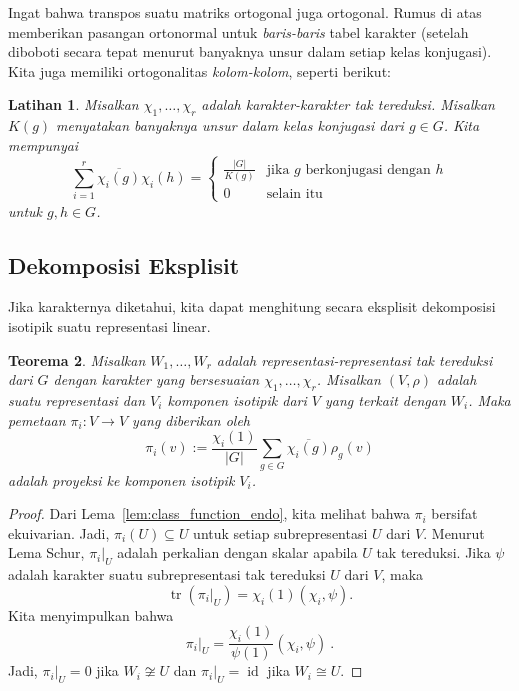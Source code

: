 \documentclass[12pt]{article}
\theoremstyle{plain}
\newtheorem{theorem}{Teorema}[section]
\newtheorem{exercise}[theorem]{Latihan}
\theoremstyle{definition}
\theoremstyle{remark}
\numberwithin{equation}{section}
\begin{document}
Ingat bahwa transpos suatu matriks ortogonal juga ortogonal.
Rumus di atas memberikan pasangan ortonormal untuk
\emph{baris-baris} tabel karakter (setelah diboboti secara tepat menurut banyaknya unsur dalam
setiap kelas konjugasi). Kita juga memiliki ortogonalitas
\emph{kolom-kolom}, seperti berikut:

\begin{exercise}
Misalkan $\chi_1,\ldots,\chi_r$ adalah karakter-karakter tak tereduksi.
Misalkan $K(g)$ menyatakan banyaknya unsur dalam kelas konjugasi dari $g \in
G$.
Kita mempunyai
\[
\sum_{i=1}^r \overline{\chi_i(g)} \chi_i(h) =
\begin{cases}
\frac{|G|}{K(g)} & \textrm{jika $g$ berkonjugasi dengan $h$}\\
0 & \textrm{selain itu}
\end{cases}
\]
untuk $g, h \in G$.
\end{exercise}

\subsection{Dekomposisi Eksplisit}

Jika karakternya diketahui, kita dapat menghitung secara eksplisit dekomposisi
isotipik suatu representasi linear.

\begin{theorem}
Misalkan $W_1,\ldots, W_r$ adalah representasi-representasi tak tereduksi dari $G$ dengan
karakter yang bersesuaian $\chi_1,\ldots, \chi_r$.
Misalkan $(V,\rho)$ adalah suatu representasi dan $V_i$ komponen isotipik
dari $V$ yang terkait dengan $W_i$.
Maka pemetaan $\pi_i : V \to V$ yang diberikan oleh
\[
\pi_i(v) := \frac{\chi_i(1)}{|G|} \sum_{g \in G} \overline{\chi_i(g)} \rho_g(v)
\]
adalah proyeksi ke komponen isotipik $V_i$.
\end{theorem}

\begin{proof}
Dari Lema~\ref{lem:class_function_endo}, kita melihat bahwa
$\pi_i$ bersifat ekuivarian.
Jadi, $\pi_i(U) \subseteq U$ untuk setiap subrepresentasi $U$ dari $V$.
Menurut Lema Schur, $\pi_i|_U$ adalah perkalian dengan skalar apabila
$U$ tak tereduksi.
Jika $\psi$ adalah karakter suatu subrepresentasi tak tereduksi $U$ dari $V$,
maka
\[
\operatorname{tr}(\pi_i|_U)=\chi_i(1) ( \chi_i, \psi ) .
\]
Kita menyimpulkan bahwa
\[
\pi_i|_U = \frac{\chi_i(1)}{\psi(1)} ( \chi_i, \psi ) \ .
\]
Jadi, $\pi_i|_U=0$ jika $W_i \not\cong U$ dan $\pi_i|_U=\operatorname{id}$
jika $W_i \cong U$.
\end{proof}
\end{document}
